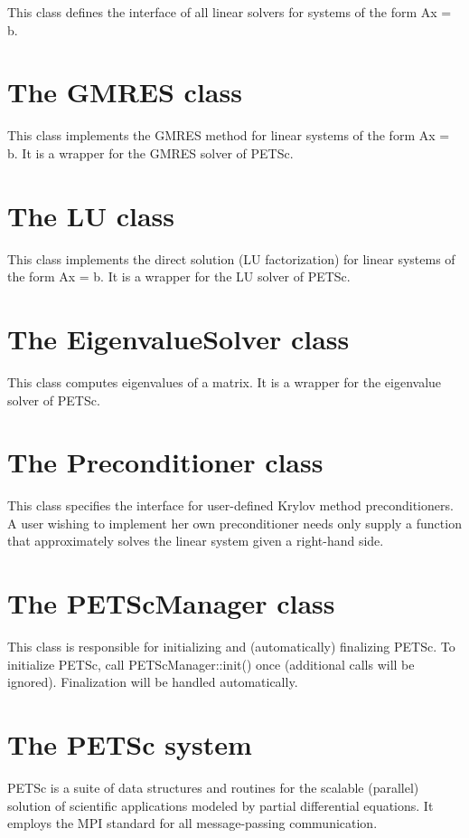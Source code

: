 This class defines the interface of all linear solvers for
systems of the form Ax = b.

\section{The GMRES class}

This class implements the GMRES method for linear systems
of the form Ax = b. It is a wrapper for the GMRES solver
of PETSc.

\section{The LU class}

This class implements the direct solution (LU factorization) for
linear systems of the form Ax = b. It is a wrapper for the LU
solver of PETSc.

\section{The EigenvalueSolver class}

This class computes eigenvalues of a matrix. It is 
a wrapper for the eigenvalue solver of PETSc.

\section{The Preconditioner class}

This class specifies the interface for user-defined Krylov
method preconditioners. A user wishing to implement her own
preconditioner needs only supply a function that approximately
solves the linear system given a right-hand side.

\section{The PETScManager class}

This class is responsible for initializing and (automatically)
finalizing PETSc. To initialize PETSc, call PETScManager::init()
once (additional calls will be ignored). Finalization will be
handled automatically.

\section{The PETSc system}

PETSc is a suite of data structures and routines for the scalable 
(parallel) solution of scientific applications modeled by partial 
differential equations.  It employs the MPI standard for all message-passing communication.  

